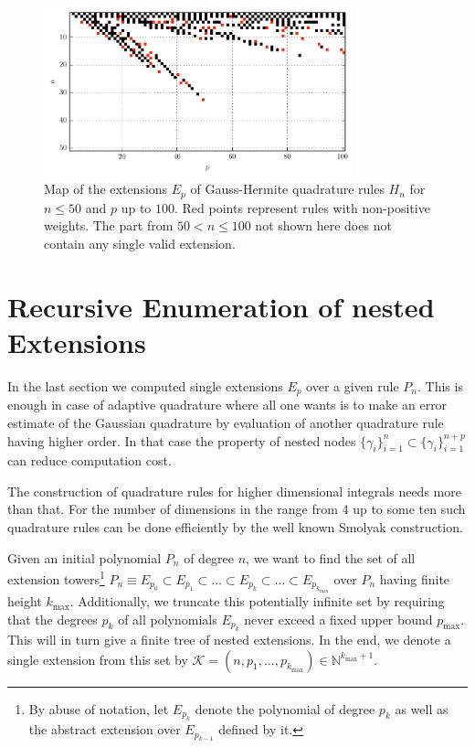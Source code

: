 \documentclass[a4paper,10pt]{article}
\begin{document}
\begin{figure}
  \centering
  \includegraphics[width=0.8\textwidth]{./img/map_herm_50_100.pdf}
  \caption{Map of the extensions $E_p$ of Gauss-Hermite quadrature rules
           $H_n$ for $n \leq 50$ and $p$ up to $100$. Red points represent
           rules with non-positive weights. The part from $50 < n \leq 100$
           not shown here does not contain any single valid extension.}
  \label{fig:map_herm_50_100}
\end{figure}


\FloatBarrier
\section{Recursive Enumeration of nested Extensions}


In the last section we computed single extensions $E_p$ over a
given rule $P_n$. This is enough in case of adaptive quadrature where all one
wants is to make an error estimate of the Gaussian quadrature by evaluation
of another quadrature rule having higher order. In that case the property of
nested nodes $\{\gamma_i\}_{i=1}^n \subset \{\gamma_i\}_{i=1}^{n+p}$ can reduce
computation cost.

The construction of quadrature rules for higher dimensional integrals
needs more than that. For the number of dimensions in the range from $4$ up
to some ten such quadrature rules can be done efficiently by the well known
Smolyak construction.

Given an initial polynomial $P_n$ of degree $n$, we want to find the set of all
extension towers\footnote{By abuse of notation, let $E_{p_k}$ denote the polynomial
of degree $p_k$ as well as the abstract extension over $E_{p_{k-1}}$ defined by it.}
$P_n \equiv E_{p_0} \subset E_{p_1} \subset \ldots \subset E_{p_k} \subset \ldots \subset E_{p_{k_{\textrm{max}}}}$
over $P_n$ having finite height $k_{\textrm{max}}$. Additionally, we truncate this
potentially infinite set by requiring that the degrees $p_k$ of all polynomials $E_{p_k}$
never exceed a fixed upper bound $p_{\textrm{max}}$. This will in turn give a finite tree
of nested extensions. In the end, we denote a single extension from this set
by $\mathcal{K} = (n, p_1, \ldots, p_{k_{\textrm{max}}}) \in \mathbb{N}^{{k_{\textrm{max}}}+1}$.
\end{document}
